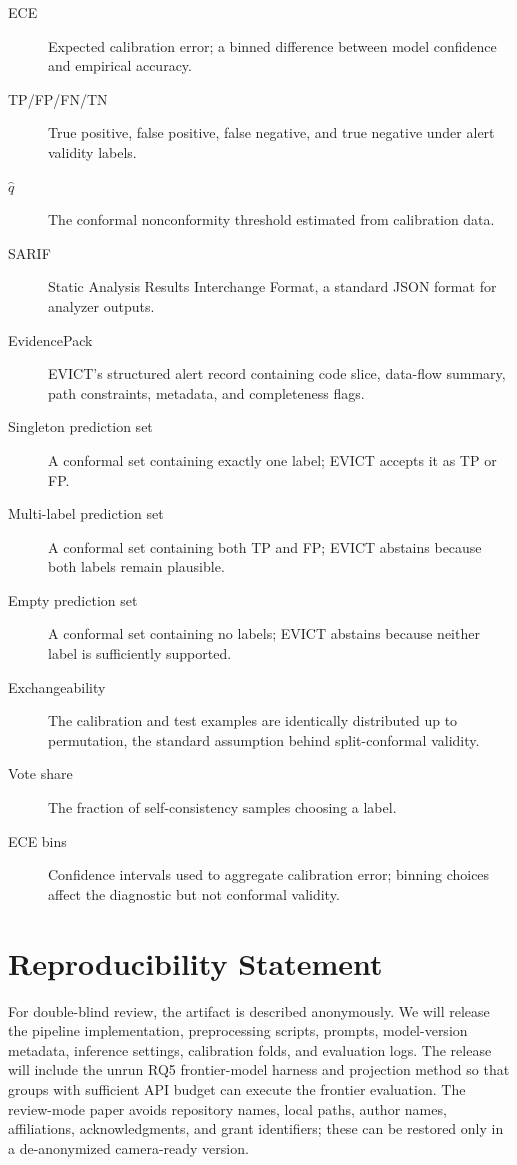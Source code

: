 \begin{description}
\item[ECE] Expected calibration error; a binned difference between model confidence and empirical accuracy.
\item[TP/FP/FN/TN] True positive, false positive, false negative, and true negative under alert validity labels.
\item[$\hat q$] The conformal nonconformity threshold estimated from calibration data.
\item[SARIF] Static Analysis Results Interchange Format, a standard JSON format for analyzer outputs.
\item[EvidencePack] EVICT's structured alert record containing code slice, data-flow summary, path constraints, metadata, and completeness flags.
\item[Singleton prediction set] A conformal set containing exactly one label; EVICT accepts it as TP or FP.
\item[Multi-label prediction set] A conformal set containing both TP and FP; EVICT abstains because both labels remain plausible.
\item[Empty prediction set] A conformal set containing no labels; EVICT abstains because neither label is sufficiently supported.
\item[Exchangeability] The calibration and test examples are identically distributed up to permutation, the standard assumption behind split-conformal validity.
\item[Vote share] The fraction of self-consistency samples choosing a label.
\item[ECE bins] Confidence intervals used to aggregate calibration error; binning choices affect the diagnostic but not conformal validity.
\end{description}

\section{Reproducibility Statement}
\label{app:reproducibility}

For double-blind review, the artifact is described anonymously. We will release the pipeline implementation, preprocessing scripts, prompts, model-version metadata, inference settings, calibration folds, and evaluation logs. The release will include the unrun RQ5 frontier-model harness and projection method so that groups with sufficient API budget can execute the frontier evaluation. The review-mode paper avoids repository names, local paths, author names, affiliations, acknowledgments, and grant identifiers; these can be restored only in a de-anonymized camera-ready version.
